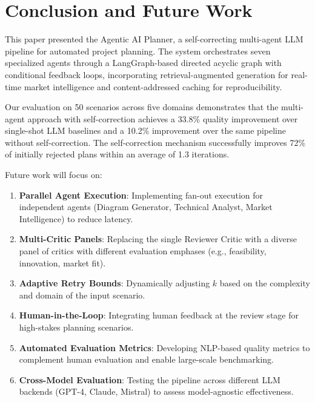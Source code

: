 \documentclass[journal]{IEEEtran}
\begin{document}
\section{Conclusion and Future Work}
\label{sec:conclusion}

This paper presented the Agentic AI Planner, a self-correcting multi-agent LLM pipeline for automated project planning. The system orchestrates seven specialized agents through a LangGraph-based directed acyclic graph with conditional feedback loops, incorporating retrieval-augmented generation for real-time market intelligence and content-addressed caching for reproducibility.

Our evaluation on 50 scenarios across five domains demonstrates that the multi-agent approach with self-correction achieves a 33.8\% quality improvement over single-shot LLM baselines and a 10.2\% improvement over the same pipeline without self-correction. The self-correction mechanism successfully improves 72\% of initially rejected plans within an average of 1.3 iterations.

Future work will focus on:

\begin{enumerate}
    \item \textbf{Parallel Agent Execution}: Implementing fan-out execution for independent agents (Diagram Generator, Technical Analyst, Market Intelligence) to reduce latency.
    
    \item \textbf{Multi-Critic Panels}: Replacing the single Reviewer Critic with a diverse panel of critics with different evaluation emphases (e.g., feasibility, innovation, market fit).
    
    \item \textbf{Adaptive Retry Bounds}: Dynamically adjusting $k$ based on the complexity and domain of the input scenario.
    
    \item \textbf{Human-in-the-Loop}: Integrating human feedback at the review stage for high-stakes planning scenarios.
    
    \item \textbf{Automated Evaluation Metrics}: Developing NLP-based quality metrics to complement human evaluation and enable large-scale benchmarking.
    
    \item \textbf{Cross-Model Evaluation}: Testing the pipeline across different LLM backends (GPT-4, Claude, Mistral) to assess model-agnostic effectiveness.
\end{enumerate}
\end{document}
